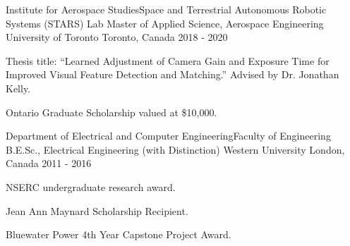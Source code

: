 

\begin{cventries}

  \cventry
    {Institute for Aerospace Studies{\enskip\cdotp\enskip}Space and Terrestrial Autonomous Robotic Systems (STARS) Lab} %
    {Master of Applied Science, Aerospace Engineering {\enskip\cdotp\enskip}University of Toronto} %
    {Toronto, Canada} %
    {2018 - 2020} %
    {
      \begin{cvitems} %
        \item {Thesis title: ``Learned Adjustment of Camera Gain and Exposure Time for Improved Visual Feature Detection and Matching.'' Advised by Dr. Jonathan Kelly.}
        \item {Ontario Graduate Scholarship valued at \$10,000.}
      \end{cvitems}
    }

  \cventry
    {Department of Electrical and Computer Engineering{\enskip\cdotp\enskip}Faculty of Engineering} %
    {B.E.Sc., Electrical Engineering (with Distinction) {\enskip\cdotp\enskip}Western University} %
    {London, Canada} %
    {2011 - 2016} %
    {
      \begin{cvitems} %
        \item {NSERC undergraduate research award.}
        \item {Jean Ann Maynard Scholarship Recipient.}
        \item {Bluewater Power 4th Year Capstone Project Award.}
      \end{cvitems}
    }

\end{cventries}
